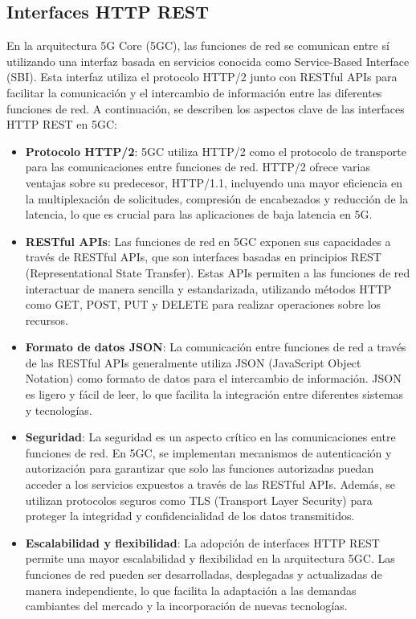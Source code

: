 \subsection{Interfaces HTTP REST}
En la arquitectura 5G Core (5GC), las funciones de red se comunican entre sí utilizando una interfaz basada en servicios conocida como Service-Based Interface (SBI). Esta interfaz utiliza el protocolo HTTP/2 junto con RESTful APIs para facilitar la comunicación y el intercambio de información entre las diferentes funciones de red. A continuación, se describen los aspectos clave de las interfaces HTTP REST en 5GC:
\begin{itemize}
    \item \textbf{Protocolo HTTP/2}: 5GC utiliza HTTP/2 como el protocolo de transporte para las comunicaciones entre funciones de red. HTTP/2 ofrece varias ventajas sobre su predecesor, HTTP/1.1, incluyendo una mayor eficiencia en la multiplexación de solicitudes, compresión de encabezados y reducción de la latencia, lo que es crucial para las aplicaciones de baja latencia en 5G.
    \item \textbf{RESTful APIs}: Las funciones de red en 5GC exponen sus capacidades a través de RESTful APIs, que son interfaces basadas en principios REST (Representational State Transfer). Estas APIs permiten a las funciones de red interactuar de manera sencilla y estandarizada, utilizando métodos HTTP como GET, POST, PUT y DELETE para realizar operaciones sobre los recursos.
    \item \textbf{Formato de datos JSON}: La comunicación entre funciones de red a través de las RESTful APIs generalmente utiliza JSON (JavaScript Object Notation) como formato de datos para el intercambio de información. JSON es ligero y fácil de leer, lo que facilita la integración entre diferentes sistemas y tecnologías.
    \item \textbf{Seguridad}: La seguridad es un aspecto crítico en las comunicaciones entre funciones de red. En 5GC, se implementan mecanismos de autenticación y autorización para garantizar que solo las funciones autorizadas puedan acceder a los servicios expuestos a través de las RESTful APIs. Además, se utilizan protocolos seguros como TLS (Transport Layer Security) para proteger la integridad y confidencialidad de los datos transmitidos.
    \item \textbf{Escalabilidad y flexibilidad}: La adopción de interfaces HTTP REST permite una mayor escalabilidad y flexibilidad en la arquitectura 5GC. Las funciones de red pueden ser desarrolladas, desplegadas y actualizadas de manera independiente, lo que facilita la adaptación a las demandas cambiantes del mercado y la incorporación de nuevas tecnologías.
\end{itemize}

